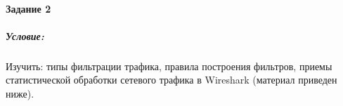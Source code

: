\paragraph{Задание 2}
\subparagraph{Условие:}
Изучить: типы фильтрации трафика, правила построения фильтров, приемы статистической обработки сетевого трафика в Wireshark (материал приведен ниже).